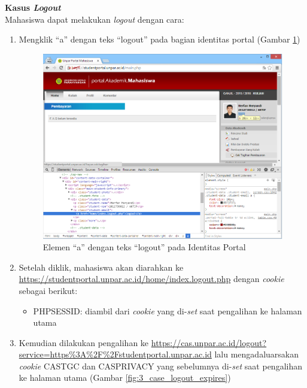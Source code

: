 \documentclass[a4paper,twoside]{article}
\begin{document}
\begin{enumerate}
\begin{enumerate}
\textbf{Kasus \textit{Logout}}\\
Mahasiswa dapat melakukan \textit{logout} dengan cara:
\begin{enumerate}
	\item Mengklik ``a'' dengan teks ``logout'' pada bagian identitas portal (Gambar \ref{fig:3_case_logout_link})
	\begin{figure}[H]
			\centering
			\includegraphics[scale=0.5]{Gambar/case-logout-link}
			\caption{Elemen ``a'' dengan teks ``logout'' pada Identitas Portal} 
			\label{fig:3_case_logout_link}
		\end{figure}
	\item Setelah diklik, mahasiswa akan diarahkan ke \url{https://studentportal.unpar.ac.id/home/index.logout.php} dengan \textit{cookie} sebagai berikut:
		\begin{itemize}
			\item PHPSESSID: diambil dari \textit{cookie} yang di-\textit{set} saat pengalihan ke halaman utama
		\end{itemize} 
	\item Kemudian dilakukan pengalihan ke \url{https://cas.unpar.ac.id/logout?service=https\%3A\%2F\%2Fstudentportal.unpar.ac.id} lalu mengadaluarsakan \textit{cookie} CASTGC dan CASPRIVACY yang sebelumnya di-\textit{set} saat pengalihan ke halaman utama (Gambar \ref{fig:3_case_logout_expires}) 
			\begin{figure}[H]
				\centering

\end{figure}
\end{enumerate}
\end{enumerate}
\end{enumerate}
\end{document}
